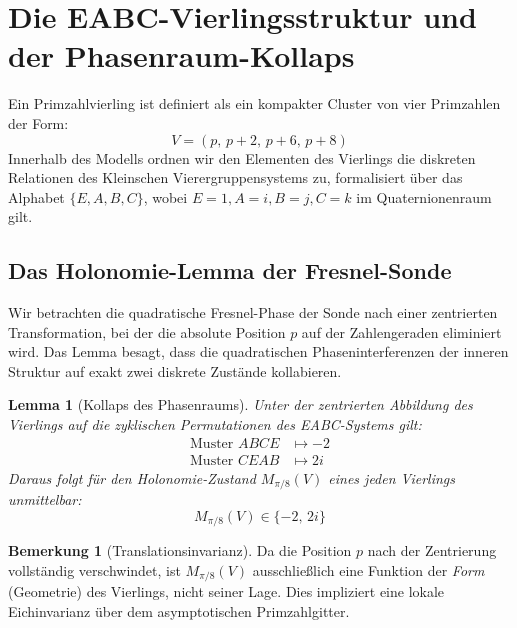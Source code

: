 \documentclass[11pt,a4paper]{article}
\theoremstyle{plain}
\newtheorem{lemma}[theorem]{Lemma}
\theoremstyle{definition}
\newtheorem{remark}[theorem]{Bemerkung}
\numberwithin{equation}{section}
\begin{document}
\section{Die EABC-Vierlingsstruktur und der Phasenraum-Kollaps}

Ein Primzahlvierling ist definiert als ein kompakter Cluster von vier Primzahlen der Form:
\begin{equation}
V = (p, \, p+2, \, p+6, \, p+8)
\end{equation}
Innerhalb des Modells ordnen wir den Elementen des Vierlings die diskreten Relationen des Kleinschen Vierergruppensystems zu, formalisiert über das Alphabet $\{E, A, B, C\}$, wobei $E=1, A=i, B=j, C=k$ im Quaternionenraum gilt.

\subsection{Das Holonomie-Lemma der Fresnel-Sonde}
Wir betrachten die quadratische Fresnel-Phase der Sonde nach einer zentrierten Transformation, bei der die absolute Position $p$ auf der Zahlengeraden eliminiert wird. Das Lemma besagt, dass die quadratischen Phaseninterferenzen der inneren Struktur auf exakt zwei diskrete Zustände kollabieren.

\begin{lemma}[Kollaps des Phasenraums]
Unter der zentrierten Abbildung des Vierlings auf die zyklischen Permutationen des EABC-Systems gilt:
\begin{align}
\text{Muster } ABCE &\mapsto -2 \\
\text{Muster } CEAB &\mapsto 2i
\end{align}
Daraus folgt für den Holonomie-Zustand $M_{\pi/8}(V)$ eines jeden Vierlings unmittelbar:
\begin{equation}
M_{\pi/8}(V) \in \{-2, \, 2i\}
\end{equation}
\end{lemma}

\begin{remark}[Translationsinvarianz]
Da die Position $p$ nach der Zentrierung vollständig verschwindet, ist $M_{\pi/8}(V)$ ausschließlich eine Funktion der \emph{Form} (Geometrie) des Vierlings, nicht seiner Lage. Dies impliziert eine lokale Eichinvarianz über dem asymptotischen Primzahlgitter.
\end{remark}
\end{document}
